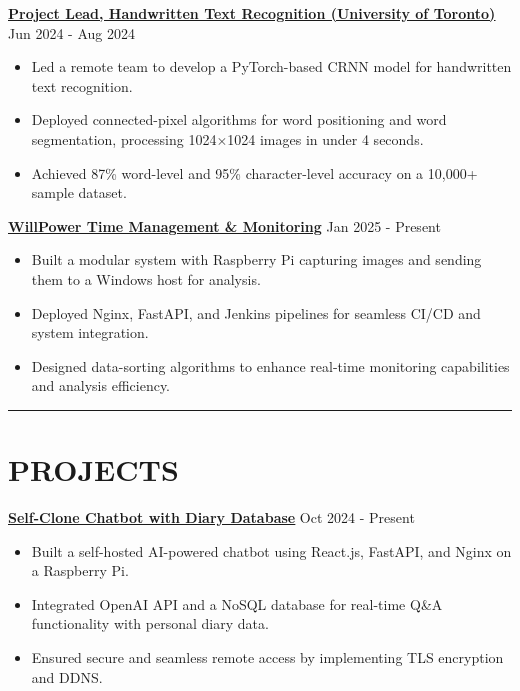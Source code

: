 \documentclass[a4paper,10pt]{article}
\begin{document}
\vspace{0.3cm}
\noindent\href{https://github.com/Ken-2511/HandwritingRecognition}{\uline{\textbf{Project Lead, Handwritten Text Recognition (University of Toronto)}}} \hfill Jun 2024 - Aug 2024
\begin{itemize}[leftmargin=0.2in]
    \item Led a remote team to develop a PyTorch-based CRNN model for handwritten text recognition.
    \item Deployed connected-pixel algorithms for word positioning and word segmentation, processing 1024$\times$1024 images in under 4 seconds.
    \item Achieved 87\% word-level and 95\% character-level accuracy on a 10,000+ sample dataset.
\end{itemize}

\vspace{0.3cm}
\noindent\href{https://github.com/Ken-2511/WillPower}{\uline{\textbf{WillPower \textbar{} Time Management \& Monitoring}}} \hfill Jan 2025 - Present
\begin{itemize}[leftmargin=0.2in]
    \item Built a modular system with Raspberry Pi capturing images and sending them to a Windows host for analysis.
    \item Deployed Nginx, FastAPI, and Jenkins pipelines for seamless CI/CD and system integration.
    \item Designed data-sorting algorithms to enhance real-time monitoring capabilities and analysis efficiency.
\end{itemize}

\noindent\rule{\linewidth}{1pt}

\section*{\textbf{PROJECTS}}

\noindent\href{https://chengyongkang.me/chat}{\uline{\textbf{Self-Clone Chatbot with Diary Database}}} \hfill Oct 2024 - Present
\begin{itemize}[leftmargin=0.2in]
    \item Built a self-hosted AI-powered chatbot using React.js, FastAPI, and Nginx on a Raspberry Pi.
    \item Integrated OpenAI API and a NoSQL database for real-time Q\&A functionality with personal diary data.
    \item Ensured secure and seamless remote access by implementing TLS encryption and DDNS.
\end{itemize}
\end{document}
